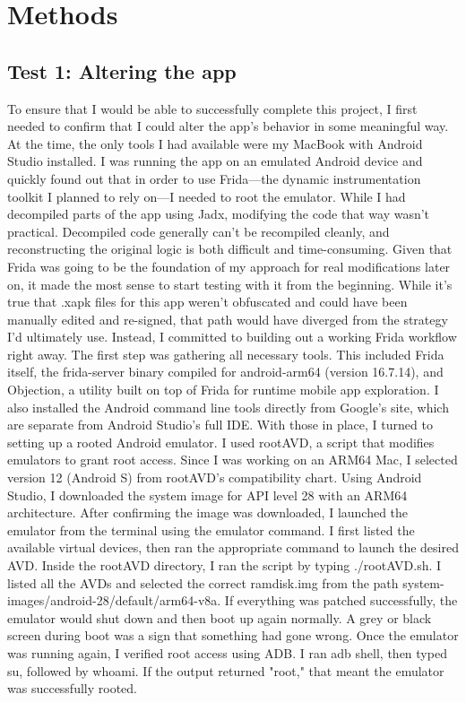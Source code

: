 \chapter{Methods}\label{bibind}
\section{Test 1: Altering the app}
To ensure that I would be able to successfully complete this project, I first needed to confirm that I could alter the app’s behavior in some meaningful way. At the time, the only tools I had available were my MacBook with Android Studio installed. I was running the app on an emulated Android device and quickly found out that in order to use Frida—the dynamic instrumentation toolkit I planned to rely on—I needed to root the emulator. While I had decompiled parts of the app using Jadx, modifying the code that way wasn’t practical. Decompiled code generally can’t be recompiled cleanly, and reconstructing the original logic is both difficult and time-consuming.
Given that Frida was going to be the foundation of my approach for real modifications later on, it made the most sense to start testing with it from the beginning. While it’s true that .xapk files for this app weren’t obfuscated and could have been manually edited and re-signed, that path would have diverged from the strategy I’d ultimately use. Instead, I committed to building out a working Frida workflow right away.
The first step was gathering all necessary tools. This included Frida itself, the frida-server binary compiled for android-arm64 (version 16.7.14), and Objection, a utility built on top of Frida for runtime mobile app exploration. I also installed the Android command line tools directly from Google’s site, which are separate from Android Studio’s full IDE.
With those in place, I turned to setting up a rooted Android emulator. I used rootAVD, a script that modifies emulators to grant root access. Since I was working on an ARM64 Mac, I selected version 12 (Android S) from rootAVD’s compatibility chart. Using Android Studio, I downloaded the system image for API level 28 with an ARM64 architecture. After confirming the image was downloaded, I launched the emulator from the terminal using the emulator command. I first listed the available virtual devices, then ran the appropriate command to launch the desired AVD.
Inside the rootAVD directory, I ran the script by typing ./rootAVD.sh. I listed all the AVDs and selected the correct ramdisk.img from the path system-images/android-28/default/arm64-v8a. If everything was patched successfully, the emulator would shut down and then boot up again normally. A grey or black screen during boot was a sign that something had gone wrong. Once the emulator was running again, I verified root access using ADB. I ran adb shell, then typed su, followed by whoami. If the output returned "root," that meant the emulator was successfully rooted.
